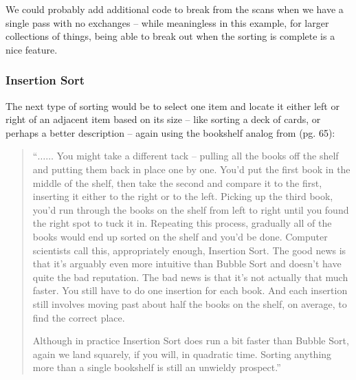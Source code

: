 We could probably add additional code to break from the scans when we have a single pass with no exchanges -- while meaningless in this example, for larger collections of things, being able to break out when the sorting is complete is a nice feature.
\clearpage

\subsubsection{Insertion Sort}
The next type of sorting would be to select one item and locate it either left or right of an adjacent item based on its size -- like sorting a deck of cards, or perhaps a better description -- again using the bookshelf analog from \cite{Christian2016} (pg. 65):
\begin{quote}
``$\dots \dots$ You might take a different tack -- pulling all the books off the shelf and putting them back in place one by one. You'd put the first book in the middle of the shelf, then take the second and compare it to the first, inserting it either to the right or to the left. Picking up the third book, you'd run through the books on the shelf from left to right until you found the right spot to tuck it in. Repeating this process, gradually all of the books would end up sorted on the shelf and you'd be done. Computer scientists call this, appropriately enough, Insertion Sort. The good news is that it's arguably even more intuitive than Bubble Sort and doesn't have quite the bad reputation. The bad news is that it's not actually that much faster. You still have to do one insertion for each book. And each insertion still involves moving past about half the books on the shelf, on average, to find the correct place.

Although in practice Insertion Sort does run a bit faster than Bubble Sort, again we land squarely, if you will, in quadratic time. Sorting anything more than a single bookshelf is still an unwieldy prospect.''
\end{quote}

